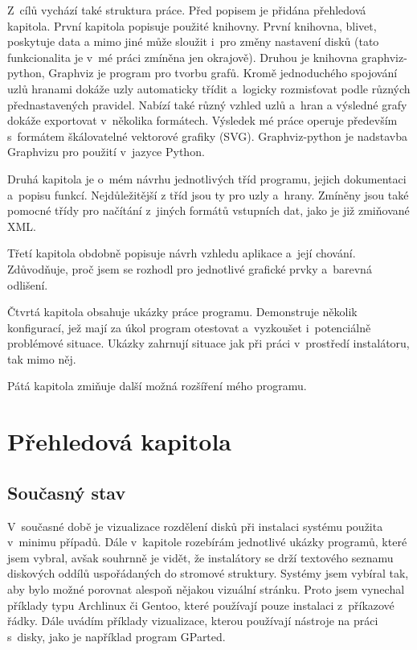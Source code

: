 \documentclass[color,table,oneside,nolot,nolof]{fithesis}
\begin{document}
	Z~cílů vychází také struktura práce. Před popisem je přidána přehledová kapitola.
	První kapitola popisuje použité knihovny. První knihovna, blivet\cite{blivet}, poskytuje data a mimo jiné může sloužit i~pro změny 
	nastavení disků (tato funkcionalita je v~mé práci zmíněna jen okrajově). Druhou je knihovna graphviz-python\cite{graphviz-python}, Graphviz je program pro tvorbu grafů. Kromě
	jednoduchého spojování uzlů hranami dokáže uzly automaticky třídit a~logicky rozmisťovat podle různých přednastavených pravidel. Nabízí také různý vzhled uzlů
	a~hran a výsledné grafy dokáže exportovat v~několika formátech. Výsledek mé práce operuje především s~formátem škálovatelné vektorové grafiky (SVG). Graphviz-python je 
	nadstavba Graphvizu pro použití v~jazyce Python.

	Druhá kapitola je o~mém návrhu jednotlivých tříd programu, jejich dokumentaci a~popisu funkcí. Nejdůležitější z tříd jsou ty pro uzly a~hrany. Zmíněny jsou také pomocné třídy 
	pro načítání z~jiných formátů vstupních dat, jako je již zmiňované XML.

	Třetí kapitola obdobně popisuje návrh vzhledu aplikace a~její chování. Zdůvodňuje, proč jsem se rozhodl pro jednotlivé grafické prvky a~barevná odlišení.

	Čtvrtá kapitola obsahuje ukázky práce programu. Demonstruje několik konfigurací, jež mají za úkol program otestovat a~vyzkoušet i~potenciálně problémové situace. Ukázky  
	zahrnují situace jak při práci v~prostředí instalátoru, tak mimo něj.

	Pátá kapitola zmiňuje další možná rozšíření mého programu. 

\chapter{Přehledová kapitola}
\section{Současný stav}

V~současné době je vizualizace rozdělení disků při instalaci systému použita v~minimu případů. Dále v~kapitole rozebírám jednotlivé ukázky programů, které jsem vybral, avšak souhrnně je vidět, 
že instalátory se drží textového seznamu diskových oddílů uspořádaných do stromové struktury. Systémy jsem vybíral tak, aby bylo možné porovnat alespoň nějakou vizuální stránku. Proto jsem vynechal
příklady typu Archlinux či Gentoo, které používají pouze instalaci z~příkazové řádky.  Dále uvádím příklady vizualizace, kterou používají nástroje na práci s~disky, jako je 
například program GParted.
\end{document}
